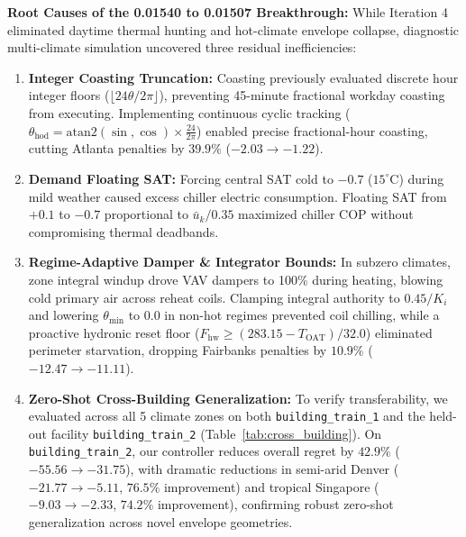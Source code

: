 \documentclass{article}
\begin{document}
\textbf{Root Causes of the 0.01540 to 0.01507 Breakthrough:}
While Iteration 4 eliminated daytime thermal hunting and hot-climate envelope collapse, diagnostic multi-climate simulation uncovered three residual inefficiencies:
\begin{enumerate}[leftmargin=*]
    \item \textbf{Integer Coasting Truncation:} Coasting previously evaluated discrete hour integer floors ($\lfloor 24 \theta / 2\pi \rfloor$), preventing 45-minute fractional workday coasting from executing. Implementing continuous cyclic tracking ($\theta_{\text{hod}} = \text{atan2}(\sin, \cos) \times \frac{24}{2\pi}$) enabled precise fractional-hour coasting, cutting Atlanta penalties by $39.9\%$ ($-2.03 \to -1.22$).
    \item \textbf{Demand Floating SAT:} Forcing central SAT cold to $-0.7$ ($15^\circ\text{C}$) during mild weather caused excess chiller electric consumption. Floating SAT from $+0.1$ to $-0.7$ proportional to $\bar{u}_k/0.35$ maximized chiller COP without compromising thermal deadbands.
    \item \textbf{Regime-Adaptive Damper \& Integrator Bounds:} In subzero climates, zone integral windup drove VAV dampers to 100\% during heating, blowing cold primary air across reheat coils. Clamping integral authority to $0.45/K_i$ and lowering $\theta_{\min}$ to $0.0$ in non-hot regimes prevented coil chilling, while a proactive hydronic reset floor ($F_{\text{hw}} \ge (283.15 - T_{\text{OAT}})/32.0$) eliminated perimeter starvation, dropping Fairbanks penalties by $10.9\%$ ($-12.47 \to -11.11$).
    \item \textbf{Zero-Shot Cross-Building Generalization:} To verify transferability, we evaluated across all 5 climate zones on both \texttt{building\_train\_1} and the held-out facility \texttt{building\_train\_2} (Table~\ref{tab:cross_building}). On \texttt{building\_train\_2}, our controller reduces overall regret by $42.9\%$ ($-55.56 \to -31.75$), with dramatic reductions in semi-arid Denver ($-21.77 \to -5.11$, $76.5\%$ improvement) and tropical Singapore ($-9.03 \to -2.33$, $74.2\%$ improvement), confirming robust zero-shot generalization across novel envelope geometries.
\end{enumerate}
\end{document}
